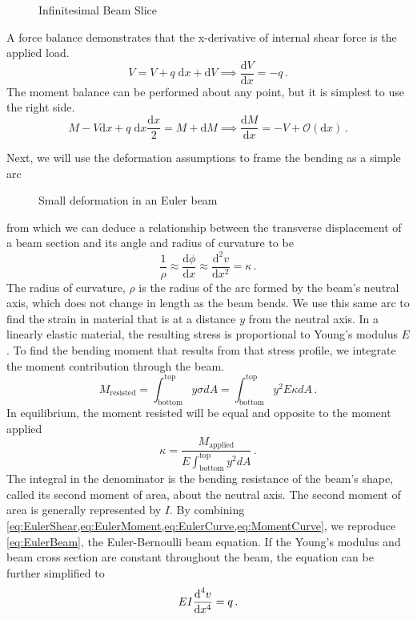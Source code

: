 %
\begin{figure}[htbp]
  \centering
  
  \caption{Infinitesimal Beam Slice}
  \label{fig:Infinitesimal}
\end{figure}
%
A force balance demonstrates that the x-derivative of internal shear force is the applied load.
\begin{equation}
\label{eq:EulerShear}
V = V + q\;\text{d}x + \text{d}V \implies \frac{\text{d}V}{\text{d}x} = -q\, .
\end{equation}
The moment balance can be performed about any point, but it is simplest to use the right side.
\begin{equation}
\label{eq:EulerMoment}
M - V\text{d}x +q\;\text{d}x\frac{\text{d}x}{2} = M + \text{d}M \implies \frac{\text{d} M}{\text{d}x} = -V + \mathcal{O}(\text{d}x)\, .
\end{equation}


Next, we will use the deformation assumptions to frame the bending as a simple arc
%
\begin{figure}[htbp]
  \centering
  
  \caption{Small deformation in an Euler beam}
  \label{fig:EulerBeam1}
\end{figure}
%
from which we can deduce a relationship between the transverse displacement of a beam section and its angle and radius of curvature to be
\begin{equation}
 \label{eq:EulerCurve}
 \frac{1}{\rho} \approx \frac{\text{d} \phi}{\text{d} x} \approx \frac{\text{d}^2v}{\text{d}x^2} = \kappa\, .
\end{equation}
The radius of curvature, $\rho$ is the radius of the arc formed by the beam's neutral axis, which does not change in length as the beam bends.
We use this same arc to find the strain in material that is at a distance $y$ from the neutral axis.
In a linearly elastic material, the resulting stress is proportional to Young's modulus $E$.
To find the bending moment that results from that stress profile, we integrate the moment contribution through the beam.
\begin{equation}
M_\text{resisted} = \int_\text{bottom}^\text{top}y\sigma dA = \int_\text{bottom}^\text{top}y^2 E \kappa dA\, .
\end{equation}
In equilibrium, the moment resisted will be equal and opposite to the moment applied
\begin{equation}
\label{eq:MomentCurve}
\kappa = \frac{M_\text{applied}}{E \int_\text{bottom}^\text{top}y^2dA}\, .
\end{equation}
The integral in the denominator is the bending resistance of the beam's shape, called its second moment of area, about the neutral axis.
The second moment of area is generally represented by $I$.
By combining \cref{eq:EulerShear,eq:EulerMoment,eq:EulerCurve,eq:MomentCurve}, we reproduce  \cref{eq:EulerBeam}, the Euler-Bernoulli beam equation.
If the Young's modulus and beam cross section are constant throughout the beam, the equation can be further simplified to
\begin{equation}
EI\frac{\text{d}^4 v}{\text{d}x^4}=q\, .\notag
\end{equation}

